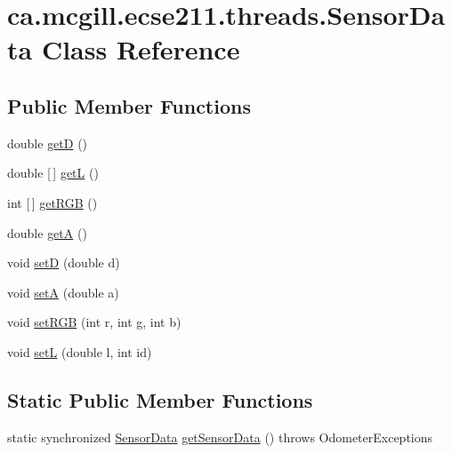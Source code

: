 \hypertarget{classca_1_1mcgill_1_1ecse211_1_1threads_1_1_sensor_data}{}\section{ca.\+mcgill.\+ecse211.\+threads.\+Sensor\+Data Class Reference}
\label{classca_1_1mcgill_1_1ecse211_1_1threads_1_1_sensor_data}
\subsection*{Public Member Functions}
\begin{DoxyCompactItemize}
\item 
double \hyperlink{classca_1_1mcgill_1_1ecse211_1_1threads_1_1_sensor_data_a46cc30522719018a80f89624e0ce458f}{getD} ()
\item 
double \mbox{[}$\,$\mbox{]} \hyperlink{classca_1_1mcgill_1_1ecse211_1_1threads_1_1_sensor_data_a39eec50582f0e4bcff8a4669c48e1609}{getL} ()
\item 
int \mbox{[}$\,$\mbox{]} \hyperlink{classca_1_1mcgill_1_1ecse211_1_1threads_1_1_sensor_data_a76313564e284f5cdb66aefce4e595f3b}{get\+R\+GB} ()
\item 
double \hyperlink{classca_1_1mcgill_1_1ecse211_1_1threads_1_1_sensor_data_acc8f6cc56f39c8ea6b812cd8b135eca6}{getA} ()
\item 
void \hyperlink{classca_1_1mcgill_1_1ecse211_1_1threads_1_1_sensor_data_a2c1f8e625478b89aabe6e9911e482ef3}{setD} (double d)
\item 
void \hyperlink{classca_1_1mcgill_1_1ecse211_1_1threads_1_1_sensor_data_a35b1941d44e86b81eb7c625efbd3c8ba}{setA} (double a)
\item 
void \hyperlink{classca_1_1mcgill_1_1ecse211_1_1threads_1_1_sensor_data_a6ad23111ecd378099f0b4ed0b6d398bc}{set\+R\+GB} (int r, int g, int b)
\item 
void \hyperlink{classca_1_1mcgill_1_1ecse211_1_1threads_1_1_sensor_data_a1c2c38354fc5a66b4667e1d47ab6b20b}{setL} (double l, int id)
\end{DoxyCompactItemize}
\subsection*{Static Public Member Functions}
\begin{DoxyCompactItemize}
\item 
static synchronized \hyperlink{classca_1_1mcgill_1_1ecse211_1_1threads_1_1_sensor_data}{Sensor\+Data} \hyperlink{classca_1_1mcgill_1_1ecse211_1_1threads_1_1_sensor_data_a8260aba53b4474ca1275e4ce26157977}{get\+Sensor\+Data} ()  throws Odometer\+Exceptions 
\end{DoxyCompactItemize}
